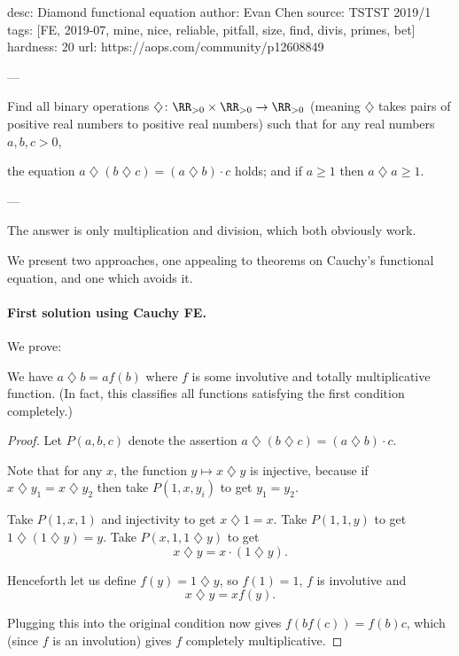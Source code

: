 desc: Diamond functional equation
author: Evan Chen
source: TSTST 2019/1
tags: [FE, 2019-07, mine, nice, reliable, pitfall, size, find, divis, primes, bet]
hardness: 20
url: https://aops.com/community/p12608849

---

\def\di{\mathbin{\diamondsuit}}
Find all binary operations $\di \colon \RR_{>0} \times \RR_{>0} \to \RR_{>0}$
(meaning $\di$ takes pairs of
positive real numbers to positive real numbers)
such that for any real numbers $a,b,c > 0$,
\begin{itemize}
  \ii the equation $a \di (b \di c) = (a \di b) \cdot c$ holds; and
  \ii if $a \ge 1$ then $a \di a \ge 1$.
\end{itemize}

---


\def\di{\mathbin{\diamondsuit}}
The answer is only multiplication and division,
which both obviously work.

We present two approaches,
one appealing to theorems on Cauchy's functional equation,
and one which avoids it.

\paragraph{First solution using Cauchy FE.}
We prove:
\begin{claim*}
  We have $a \di b = a f(b)$ where $f$ is
  some involutive and totally multiplicative function.
  (In fact, this classifies all functions
  satisfying the first condition completely.)
\end{claim*}
\begin{proof}
  Let $P(a,b,c)$ denote the
  assertion $a \di (b \di c) = (a \di b) \cdot c$.
  \begin{itemize}
    \ii Note that for any $x$,
    the function $y \mapsto x \di y$ is injective,
    because if $x \di y_1 = x \di y_2$ then take $P(1, x, y_i)$
    to get $y_1 = y_2$.

    \ii Take $P(1,x,1)$ and injectivity to get $x \di 1 = x$.
    \ii Take $P(1,1,y)$ to get $1 \di (1 \di y) = y$.
    \ii Take $P(x, 1, 1 \di y)$ to get
    \[ x \di y = x \cdot (1 \di y). \]
  \end{itemize}
  Henceforth let us define $f(y) = 1 \di y$, so
  $f(1) = 1$, $f$ is involutive and
  \[ x \di y = xf(y). \]

  Plugging this into the original condition now gives
  $f(bf(c)) = f(b)c$,
  which (since $f$ is an involution)
  gives $f$ completely multiplicative.
\end{proof}

